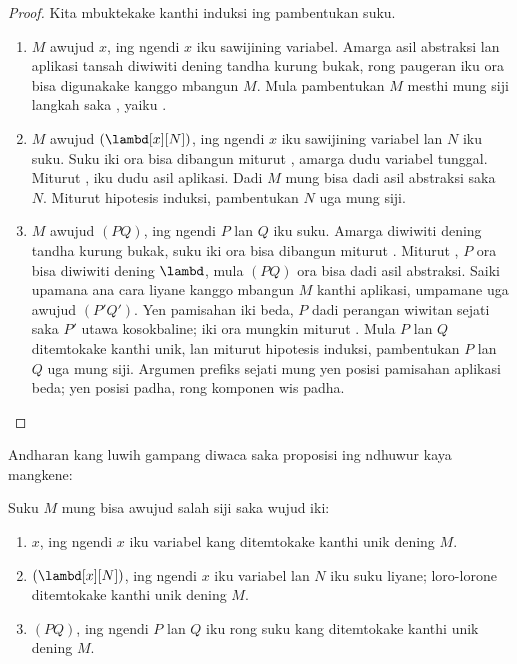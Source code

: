 \documentclass[../../../include/open-logic-section]{subfiles}
\begin{document}
\begin{proof}
  Kita mbuktekake kanthi induksi ing
  pambentukan suku.
  \begin{enumerate}
    \item $M$ awujud
      $x$, ing ngendi $x$ iku sawijining
      variabel. Amarga asil abstraksi
      lan aplikasi tansah diwiwiti
      dening tandha kurung bukak, rong
      paugeran iku ora bisa digunakake
      kanggo mbangun $M$. Mula
      pambentukan $M$ mesthi mung
      siji langkah saka
      ,
      yaiku .
    \item $M$ awujud
      $(\lambd[x][N])$, ing ngendi
      $x$ iku sawijining variabel lan
      $N$ iku suku. Suku iki ora bisa
      dibangun miturut
      ,
      amarga dudu variabel tunggal.
      Miturut ,
      iku dudu asil aplikasi. Dadi
      $M$ mung bisa dadi asil abstraksi
      saka~$N$. Miturut hipotesis
      induksi, pambentukan $N$ uga
      mung siji.
    \item $M$ awujud $(PQ)$, ing
      ngendi $P$ lan $Q$ iku suku.
      Amarga diwiwiti dening tandha
      kurung bukak, suku iki ora bisa
      dibangun miturut
      .
      Miturut ,
      $P$ ora bisa diwiwiti dening
      $\lambd$, mula $(PQ)$ ora
      bisa dadi asil abstraksi.
      Saiki upamana ana cara liyane
      kanggo mbangun $M$ kanthi
      aplikasi, umpamane uga awujud
      $(P'Q')$. Yen pamisahan iki
      beda, $P$ dadi perangan wiwitan
      sejati saka $P'$ utawa kosokbaline;
      iki ora mungkin miturut
      . Mula
      $P$ lan $Q$ ditemtokake kanthi
      unik, lan miturut hipotesis
      induksi, pambentukan $P$
      lan $Q$ uga mung siji. Argumen prefiks sejati mung yen posisi pamisahan aplikasi beda; yen posisi padha, rong komponen wis padha.
  \end{enumerate}
\end{proof}

Andharan kang luwih gampang diwaca
saka proposisi ing ndhuwur kaya
mangkene:
\begin{prop}
  Suku $M$ mung bisa awujud salah
  siji saka wujud iki:
  \begin{enumerate}
    \item $x$, ing ngendi $x$ iku
      variabel kang ditemtokake kanthi
      unik dening $M$.
    \item $(\lambd[x][N])$, ing ngendi
      $x$ iku variabel lan $N$ iku
      suku liyane; loro-lorone
      ditemtokake kanthi unik
      dening $M$.
    \item $(PQ)$, ing ngendi $P$ lan
      $Q$ iku rong suku kang
      ditemtokake kanthi unik
      dening $M$.
  \end{enumerate}
\end{prop}
\end{document}
